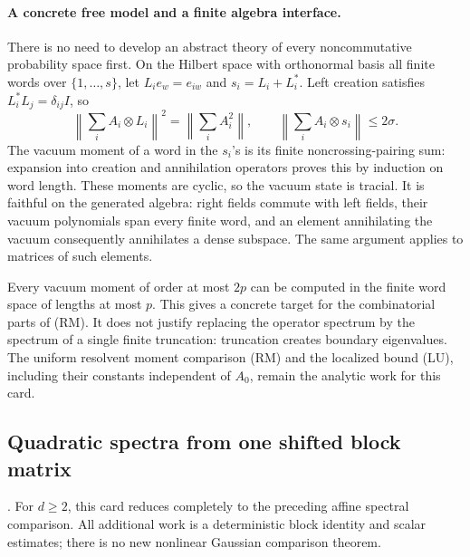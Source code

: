 \documentclass[11pt,a4paper]{article}
\newcommand{\norm}[1]{\left\lVert#1\right\rVert}
\DeclareRobustCommand{\code}[1]{{\footnotesize\urlstyle{tt}\nolinkurl{#1}}}
\begin{document}
\paragraph{A concrete free model and a finite algebra interface.}
There is no need to develop an abstract theory of every noncommutative
probability space first.  On the Hilbert space with orthonormal basis all
finite words over \(\{1,\ldots,s\}\), let \(L_i e_w=e_{iw}\) and
\(s_i=L_i+L_i^*\).  Left creation satisfies \(L_i^*L_j=\delta_{ij}I\), so
\[
 \norm{\sum_i A_i\otimes L_i}^2=\norm{\sum_iA_i^2},
 \qquad \norm{\sum_iA_i\otimes s_i}\leq2\sigma.
\]
The vacuum moment of a word in the \(s_i\)'s is its finite noncrossing-pairing
sum: expansion into creation and annihilation operators proves this by
induction on word length.  These moments are cyclic, so the vacuum state is
tracial.  It is faithful on the generated algebra: right fields commute with
left fields, their vacuum polynomials span every finite word, and an element
annihilating the vacuum consequently annihilates a dense subspace.  The same
argument applies to matrices of such elements.

Every vacuum moment of order at most \(2p\) can be computed in the finite
word space of lengths at most \(p\).  This gives a concrete target for the
combinatorial parts of (RM).  It does not justify replacing the operator
spectrum by the spectrum of a single finite truncation: truncation creates
boundary eigenvalues.  The uniform resolvent moment comparison (RM) and the
localized bound (LU), including their constants independent of \(A_0\),
remain the analytic work for this card.

\subsection{Quadratic spectra from one shifted block matrix}
\label{route:gaussian-quadratic-free-spectrum}
\noindent\code{gaussian-quadratic-free-spectrum}.
For \(d\geq2\), this card reduces completely to the preceding affine spectral comparison.
All additional work is a deterministic block identity and scalar estimates;
there is no new nonlinear Gaussian comparison theorem.
\end{document}
